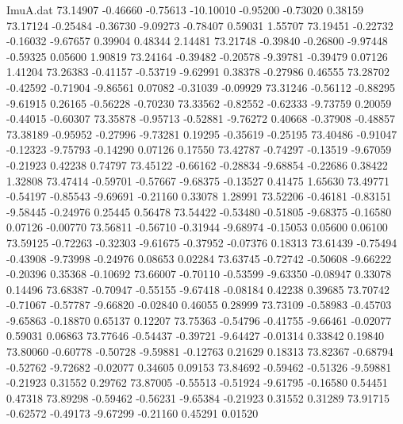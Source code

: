 \begin{filecontents}{ImuA.dat}
  73.14907   -0.46660   -0.75613  -10.10010   -0.95200   -0.73020    0.38159
  73.17124   -0.25484   -0.36730   -9.09273   -0.78407    0.59031    1.55707
  73.19451   -0.22732   -0.16032   -9.67657    0.39904    0.48344    2.14481
  73.21748   -0.39840   -0.26800   -9.97448   -0.59325    0.05600    1.90819
  73.24164   -0.39482   -0.20578   -9.39781   -0.39479    0.07126    1.41204
  73.26383   -0.41157   -0.53719   -9.62991    0.38378   -0.27986    0.46555
  73.28702   -0.42592   -0.71904   -9.86561    0.07082   -0.31039   -0.09929
  73.31246   -0.56112   -0.88295   -9.61915    0.26165   -0.56228   -0.70230
  73.33562   -0.82552   -0.62333   -9.73759    0.20059   -0.44015   -0.60307
  73.35878   -0.95713   -0.52881   -9.76272    0.40668   -0.37908   -0.48857
  73.38189   -0.95952   -0.27996   -9.73281    0.19295   -0.35619   -0.25195
  73.40486   -0.91047   -0.12323   -9.75793   -0.14290    0.07126    0.17550
  73.42787   -0.74297   -0.13519   -9.67059   -0.21923    0.42238    0.74797
  73.45122   -0.66162   -0.28834   -9.68854   -0.22686    0.38422    1.32808
  73.47414   -0.59701   -0.57667   -9.68375   -0.13527    0.41475    1.65630
  73.49771   -0.54197   -0.85543   -9.69691   -0.21160    0.33078    1.28991
  73.52206   -0.46181   -0.83151   -9.58445   -0.24976    0.25445    0.56478
  73.54422   -0.53480   -0.51805   -9.68375   -0.16580    0.07126   -0.00770
  73.56811   -0.56710   -0.31944   -9.68974   -0.15053    0.05600    0.06100
  73.59125   -0.72263   -0.32303   -9.61675   -0.37952   -0.07376    0.18313
  73.61439   -0.75494   -0.43908   -9.73998   -0.24976    0.08653    0.02284
  73.63745   -0.72742   -0.50608   -9.66222   -0.20396    0.35368   -0.10692
  73.66007   -0.70110   -0.53599   -9.63350   -0.08947    0.33078    0.14496
  73.68387   -0.70947   -0.55155   -9.67418   -0.08184    0.42238    0.39685
  73.70742   -0.71067   -0.57787   -9.66820   -0.02840    0.46055    0.28999
  73.73109   -0.58983   -0.45703   -9.65863   -0.18870    0.65137    0.12207
  73.75363   -0.54796   -0.41755   -9.66461   -0.02077    0.59031    0.06863
  73.77646   -0.54437   -0.39721   -9.64427   -0.01314    0.33842    0.19840
  73.80060   -0.60778   -0.50728   -9.59881   -0.12763    0.21629    0.18313
  73.82367   -0.68794   -0.52762   -9.72682   -0.02077    0.34605    0.09153
  73.84692   -0.59462   -0.51326   -9.59881   -0.21923    0.31552    0.29762
  73.87005   -0.55513   -0.51924   -9.61795   -0.16580    0.54451    0.47318
  73.89298   -0.59462   -0.56231   -9.65384   -0.21923    0.31552    0.31289
  73.91715   -0.62572   -0.49173   -9.67299   -0.21160    0.45291    0.01520

\end{filecontents}
